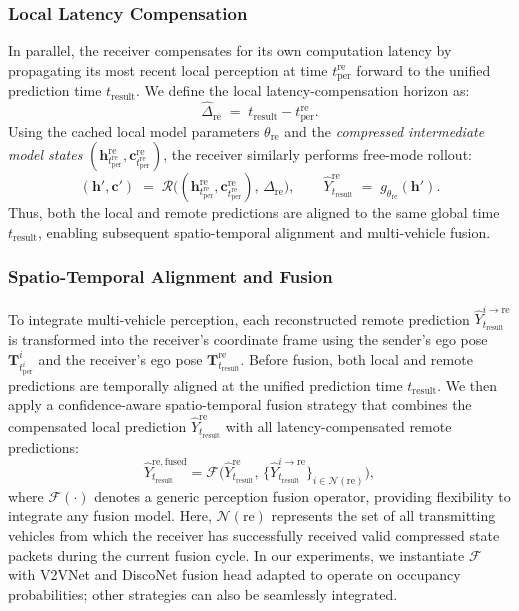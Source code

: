 \subsubsection{Local Latency Compensation}
In parallel, the receiver compensates for its own computation latency by propagating its most recent local perception at time $t^{\text{re}}_{\text{per}}$ forward to the unified prediction time $t_{\text{result}}$. We define the local latency-compensation horizon as:
\[
\widehat{\Delta}_{\text{re}} \;=\; t_{\text{result}} - t^{\text{re}}_{\text{per}}.
\]
Using the cached local model parameters $\theta_{\text{re}}$ and the \emph{compressed intermediate model states} $(\mathbf{h}^{\text{re}}_{t^{\text{re}}_{\text{per}}}, \mathbf{c}^{\text{re}}_{t^{\text{re}}_{\text{per}}})$, the receiver similarly performs free-mode rollout:
\[
(\mathbf{h}',\mathbf{c}') \;=\; \mathcal{R}\!\Big((\mathbf{h}^{\text{re}}_{t^{\text{re}}_{\text{per}}}, \mathbf{c}^{\text{re}}_{t^{\text{re}}_{\text{per}}}),\,\widehat{\Delta}_{\text{re}}\Big), 
\qquad
\widehat{Y}^{\text{re}}_{t_{\text{result}}} \;=\; g_{\theta_{\text{re}}}(\mathbf{h}').
\]
Thus, both the local and remote predictions are aligned to the same global time $t_{\text{result}}$, enabling subsequent spatio-temporal alignment and multi-vehicle fusion.


\subsubsection{Spatio-Temporal Alignment and Fusion}
To integrate multi-vehicle perception, each reconstructed remote prediction $\widehat{Y}^{i \rightarrow \text{re}}_{t_{\text{result}}}$ is transformed into the receiver’s coordinate frame using the sender’s ego pose $\mathbf{T}^i_{t^{i}_{\text{per}}}$ and the receiver’s ego pose $\mathbf{T}^{\text{re}}_{t_{\text{result}}}$.  
Before fusion, both local and remote predictions are temporally aligned at the unified prediction time $t_{\text{result}}$.  
We then apply a confidence-aware spatio-temporal fusion strategy that combines the compensated local prediction $\widehat{Y}^{\text{re}}_{t_{\text{result}}}$ with all latency-compensated remote predictions:
\begin{equation}
    \widehat{Y}^{\text{re},\mathrm{fused}}_{t_{\text{result}}}
    = \mathcal{F}\!\Big(
        \widehat{Y}^{\text{re}}_{t_{\text{result}}},\,
        \{\widehat{Y}^{i \rightarrow \text{re}}_{t_{\text{result}}}\}_{i \in \mathcal{N}(\text{re})}
    \Big),
\end{equation}
where $\mathcal{F}(\cdot)$ denotes a generic perception fusion operator, providing flexibility to integrate any fusion model.  
Here, $\mathcal{N}(\text{re})$ represents the set of all transmitting vehicles from which the receiver  has successfully received valid compressed state packets during the current fusion cycle.  
In our experiments, we instantiate $\mathcal{F}$ with V2VNet\cite{wang2020v2vnet} and DiscoNet\cite{li2021learning} fusion head adapted to operate on occupancy probabilities; other strategies can also be seamlessly integrated.


